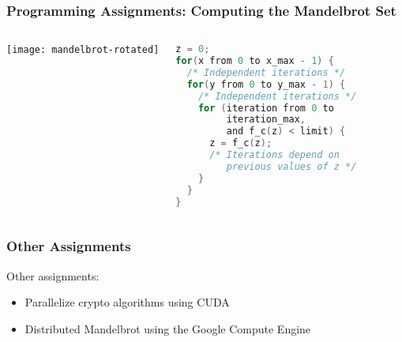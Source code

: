 \documentclass[10pt, compress, aspectratio=169]{beamer}
\begin{document}
\begin{frame}[fragile]
    \frametitle{Programming Assignments: Computing the Mandelbrot Set}
    \begin{columns}[T,onlytextwidth]
        \begin{center}
            \texttt{[image: mandelbrot-rotated]}
        \end{center}

        \begin{center}
            \begin{lstlisting}[language=C, basicstyle=\ttfamily\normalsize, numbers=none,
                   frame=no, showspaces=false, showstringspaces=false,
                   numberstyle=\tiny,
                   xleftmargin=0.1cm,
                   keywords={%
                       DATATYPE, pthread_t, pthread_create,
                       pthread_join, task_function, NULL, int, main,
                       void, printf, return, pthread_mutex_t,
                       pthread_attr_t, pthread_attr_init,
                       MAX_THREADS, SIZE, char, struct, malloc,
                       MIN, pthread_mutex_lock, pthread_mutex_unlock,
                       pthread_exit, from, to, and, for%
                       },
                   otherkeywords={::, \#pragma, \#include, <<<,>>>, \&, \*, +, -, /, [, ], >, <}
                   ]
z = 0;
for(x from 0 to x_max - 1) {
  /* Independent iterations */
  for(y from 0 to y_max - 1) {
    /* Independent iterations */
    for (iteration from 0 to
         iteration_max,
         and f_c(z) < limit) {
      z = f_c(z);
      /* Iterations depend on
         previous values of z */
    }
  }
}
            \end{lstlisting}
        \end{center}
    \end{columns}
\end{frame}

\begin{frame}
    \frametitle{Other Assignments}
    Other assignments:

    \begin{itemize}
        \item Parallelize crypto algorithms using CUDA
        \item Distributed Mandelbrot using the Google Compute Engine
    \end{itemize}
\end{frame}
\end{document}
